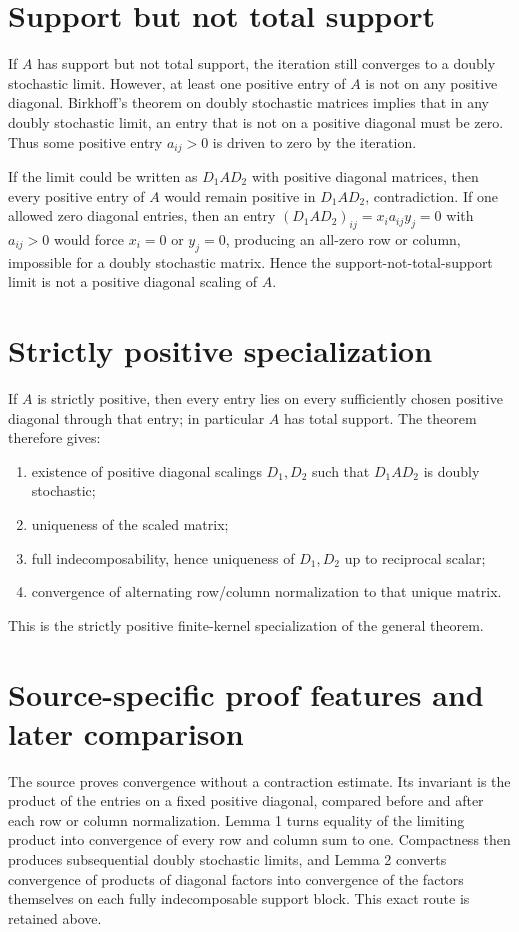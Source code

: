 \section{Support but not total support}
If \(A\) has support but not total support, the iteration still converges to a doubly stochastic limit.  However, at least one positive entry of \(A\) is not on any positive diagonal.  Birkhoff's theorem on doubly stochastic matrices implies that in any doubly stochastic limit, an entry that is not on a positive diagonal must be zero.  Thus some positive entry \(a_{ij}>0\) is driven to zero by the iteration.

If the limit could be written as \(D_1AD_2\) with positive diagonal matrices, then every positive entry of \(A\) would remain positive in \(D_1AD_2\), contradiction.  If one allowed zero diagonal entries, then an entry \((D_1AD_2)_{ij}=x_i a_{ij}y_j=0\) with \(a_{ij}>0\) would force \(x_i=0\) or \(y_j=0\), producing an all-zero row or column, impossible for a doubly stochastic matrix.  Hence the support-not-total-support limit is not a positive diagonal scaling of \(A\).

\section{Strictly positive specialization}
If \(A\) is strictly positive, then every entry lies on every sufficiently chosen positive diagonal through that entry; in particular \(A\) has total support.  The theorem therefore gives:
\begin{enumerate}[leftmargin=2em]
\item existence of positive diagonal scalings \(D_1,D_2\) such that \(D_1AD_2\) is doubly stochastic;
\item uniqueness of the scaled matrix;
\item full indecomposability, hence uniqueness of \(D_1,D_2\) up to reciprocal scalar;
\item convergence of alternating row/column normalization to that unique matrix.
\end{enumerate}
This is the strictly positive finite-kernel specialization of the general theorem.

\section{Source-specific proof features and later comparison}
The source proves convergence without a contraction estimate.  Its invariant is the product of the entries on a fixed positive diagonal, compared before and after each row or column normalization.  Lemma 1 turns equality of the limiting product into convergence of every row and column sum to one.  Compactness then produces subsequential doubly stochastic limits, and Lemma 2 converts convergence of products of diagonal factors into convergence of the factors themselves on each fully indecomposable support block.  This exact route is retained above.

